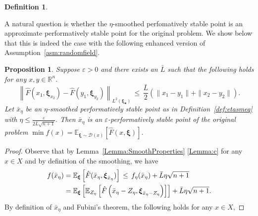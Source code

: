 \documentclass[11pt,reqno]{amsart}
\newcommand{\1}{{\bf 1}}
\newcommand{\2}{{\bf 2}}
\newcommand{\mr}[1]{{\color{blue}#1}}
\newcommand{\us}[1]{\textcolor{red}{#1}}
\newcommand{\bxi}{\boldsymbol{\xi}}
\newcommand{\E}{\mathbb E}
\newcommand{\R}{\mathbb R}
\newcommand{\lnn}{\left\|}
\newcommand{\rnn}{\right\|}
\numberwithin{equation}{section}
\newtheorem{proposition}{Proposition}[section]
\newtheorem{definition}{Definition}[section]
\theoremstyle{remark}
\begin{document}
{\begin{definition}
				\end{definition}
				
				\medskip
				
				A natural question is whether the $\eta$-smoothed {perfomatively stable point} is an approximate {performatively stable point} for the original problem. We show below that this is indeed the case with the following enhanced version of Assumption~\ref{asm:randomfield}.
				\begin{proposition}
					Suppose $\varepsilon > 0$ and there exists an $\bar{L}$ such that the following holds for any $x, y \in \R^n$.
					\begin{equation}\label{eq:asmenhance}
						{\lnn \hat{F}(x_1, \bxi_{x_2}) - \hat{F}(y_1, \bxi_{y_2}) \rnn}_{L^2(\bxi_\bullet)} \, \leq \, \frac{\bar{L}}{2} \left(\|x_1-y_1\|+\|x_2-y_2\|\right).
					\end{equation} Let $\bar{x}_\eta$ be an $\eta$-smoothed {performatively stable point} as in Definition~\ref{def:etasmeq} with $\eta \leq \tfrac{\varepsilon}{2\bar{L}\sqrt{n+1}}$. Then $\bar{x}_\eta$ is an $\varepsilon$-{performatively stable point} of the original problem $\min f(x)= \mathbb{E}_{\bxi \sim \mathcal{D}(x)} [\hat{F}(x, \bxi)]$.
				\end{proposition}
				\begin{proof}
				Observe that by Lemma~\ref{Lemma:SmoothProperties} \eqref{Lemma:c} for any $x \in X$ and by definition of the smoothing, we have
				\begin{align}\label{eq:fxbareta}
					\notag	f(\bar{x}_\eta) & = \mathbb{E}_{\bxi} \left[\hat{F}(\bar{x}_\eta, \bxi_{\bar{x}_\eta})\right] \,\leq \, f_\eta(\bar{x}_\eta)+\bar{L}\eta\sqrt{n+1}\\
					& =\E_{\bxi}\left[\E_{Z_\eta}\left[\hat{F}\left(\bar{x}_\eta-Z_\eta, \bxi_{\bar{x}_\eta-Z_\eta}\right)\right] \right]+\bar{L}\eta \sqrt{n+1}.
				\end{align}
				By definition of $\bar x_{\eta}$ and Fubini's theorem, the following holds for any $x \in X$,	

\end{proof}}
\end{document}
